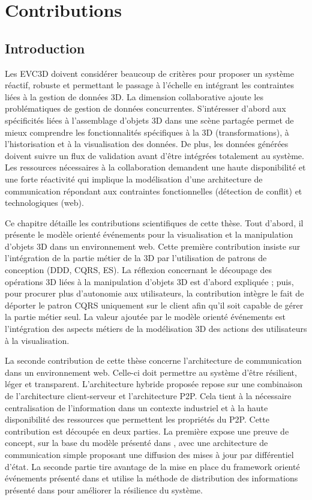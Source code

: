 \chapter{Contributions}
\chaptertable
\section{Introduction}
Les \gls{EVC3D} doivent considérer beaucoup de critères pour 
proposer un système réactif, robuste et permettant le passage à l'échelle en 
intégrant les contraintes liées à la gestion de données \gls{3D}. La dimension 
collaborative ajoute les problématiques de gestion de données concurrentes.
S'intéresser d'abord aux spécificités liées à 
l'assemblage d'objets \gls{3D} dans une scène partagée permet de 
mieux comprendre les fonctionnalités spécifiques à la \gls{3D} (transformations), 
à l'historisation et à la visualisation des données. De plus, les données générées
doivent suivre un flux de validation avant d'être intégrées totalement au système.
Les ressources nécessaires à la collaboration demandent une haute disponibilité 
et une forte réactivité qui implique la modélisation d'une architecture 
de communication répondant aux contraintes fonctionnelles (détection de conflit) 
et technologiques (web).

Ce chapitre détaille les contributions scientifiques de cette thèse.
Tout d'abord, il présente le modèle orienté événements pour la 
visualisation et la manipulation d'objets \gls{3D} dans un environnement web. 
Cette première contribution insiste sur l'intégration de la partie métier de la 
\gls{3D} par l'utilisation de
patrons de conception (\gls{DDD}, \gls{CQRS}, \gls{ES}). La réflexion concernant 
le découpage des opérations \gls{3D} liées à la manipulation d'objets \gls{3D} est 
d'abord expliquée ; puis, pour procurer plus d'autonomie 
aux utilisateurs, la contribution intègre le fait de déporter le patron \gls{CQRS} 
uniquement sur le client afin qu'il soit capable de gérer la partie métier seul. 
La valeur ajoutée par le modèle orienté événements est l'intégration des aspects métiers de la modélisation 3D des actions des utilisateurs à la visualisation. 

La seconde contribution de cette thèse concerne l'architecture de 
communication dans un environnement web. Celle-ci doit 
permettre au système d'être résilient, léger et transparent. 
L'architecture hybride proposée repose sur une combinaison de l'architecture 
client-serveur et l'architecture \gls{P2P}. 
Cela tient à la nécessaire centralisation de l'information dans un 
contexte industriel et à la haute disponibilité des ressources que permettent les
propriétés du \gls{P2P}. Cette contribution est découpée en deux parties. La 
première expose une preuve de concept, sur la base du modèle présenté 
dans \cite{Desprat2015a}, avec une architecture de communication simple 
proposant une diffusion des mises à jour par différentiel d'état. La seconde partie 
tire avantage de la mise en place du \gls{framework} orienté événements présenté 
dans 
\cite{Desprat2016} et utilise la méthode de distribution des informations présenté 
dans \cite{Desprat2017} pour améliorer la résilience du système. 


